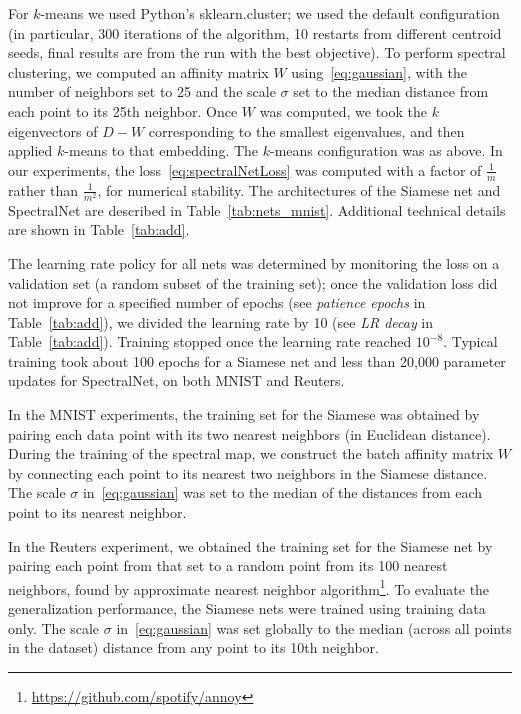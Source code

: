 \documentclass{article} %
\begin{document}
For $k$-means we used Python's sklearn.cluster; we used the default configuration (in particular, 300 iterations of the algorithm, 10 restarts from different centroid seeds, final results are from the run with the best objective).
To perform spectral clustering, we computed an affinity matrix $W$ using~\eqref{eq:gaussian}, with the number of neighbors set to 25 and the scale $\sigma$ set to the median distance from each point to its 25th neighbor. Once $W$ was computed, we took the $k$ eigenvectors of $D-W$ corresponding to the smallest eigenvalues, and then applied $k$-means to that embedding. The $k$-means configuration was as above. In our experiments, the loss~\eqref{eq:spectralNetLoss} was computed with a factor of $\frac{1}{m}$ rather than $\frac{1}{m^2}$, for numerical stability. The architectures of the Siamese net and SpectralNet are described in Table~\ref{tab:nets_mnist}. Additional technical details are shown in Table~\ref{tab:add}.

The learning rate policy for all nets was determined by monitoring the loss on a validation set (a random subset of the training set); once the validation loss did not improve for a specified number of epochs (see \textit{patience epochs} in Table~\ref{tab:add}), we divided the learning rate by 10 (see \textit{LR decay} in Table~\ref{tab:add}). Training stopped once the learning rate reached $10^{-8}$.
Typical training  took about 100 epochs for a Siamese net and less than 20,000 parameter updates for SpectralNet, on both MNIST and Reuters.

In the MNIST experiments, the training set for the Siamese was obtained by pairing each data point with its two nearest neighbors (in Euclidean distance). During the training of the spectral map, we construct the batch affinity matrix $W$ by connecting each point to its nearest two neighbors in the Siamese distance. The scale $\sigma$ in~\eqref{eq:gaussian} was set to the median of the distances from each point to its nearest neighbor.

In the Reuters experiment, we obtained the training set for the Siamese net by pairing each point from that set to a random point from its 100 nearest neighbors, found by approximate nearest neighbor algorithm\footnote{\url{https://github.com/spotify/annoy}}.
To evaluate the generalization performance, the Siamese nets were trained using training data only.
The scale $\sigma$ in~\eqref{eq:gaussian} was set globally to the median (across all points in the dataset) distance from any point to its 10th neighbor.
\end{document}
